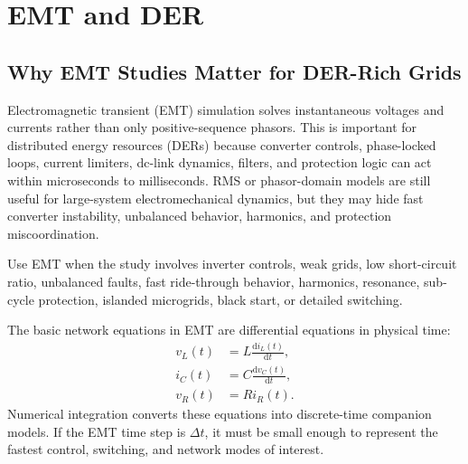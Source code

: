 \documentclass[11pt]{article}
\newcommand{\dd}{\mathrm{d}}
\begin{document}
\section{EMT and DER}

\subsection{Why EMT Studies Matter for DER-Rich Grids}
Electromagnetic transient (EMT) simulation solves instantaneous voltages and
currents rather than only positive-sequence phasors. This is important for
distributed energy resources (DERs) because converter controls, phase-locked
loops, current limiters, dc-link dynamics, filters, and protection logic can act
within microseconds to milliseconds. RMS or phasor-domain models are still useful
for large-system electromechanical dynamics, but they may hide fast converter
instability, unbalanced behavior, harmonics, and protection miscoordination.

\begin{tcolorbox}[colback=green!5,colframe=green!45!black,title=When to Use EMT]
Use EMT when the study involves inverter controls, weak grids, low short-circuit
ratio, unbalanced faults, fast ride-through behavior, harmonics, resonance,
sub-cycle protection, islanded microgrids, black start, or detailed switching.
\end{tcolorbox}

The basic network equations in EMT are differential equations in physical time:
\begin{align}
v_L(t)&=L\frac{\dd i_L(t)}{\dd t},\\
i_C(t)&=C\frac{\dd v_C(t)}{\dd t},\\
v_R(t)&=Ri_R(t).
\end{align}
Numerical integration converts these equations into discrete-time companion
models. If the EMT time step is $\Delta t$, it must be small enough to represent
the fastest control, switching, and network modes of interest.
\end{document}
